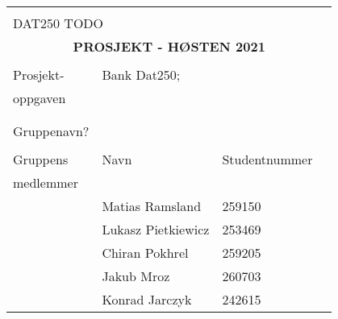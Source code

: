 \documentclass[11pt,a4]{report}
\begin{document}
\setlength{\parskip}{0.5cm}   %

\pagestyle{fancyplain}
\renewcommand{\chaptermark}[1]{\markboth{#1}{#1}}
\renewcommand{\sectionmark}[1]{\markright{\thesection\ #1}}
\lhead[\fancyplain{}{\bfseries\thepage}]{\fancyplain{}{\bfseries\rightmark}}
\rhead{}
\chead{}
\cfoot{\bfseries\thepage}
\lfoot{}
\rfoot{}


\renewcommand{\lstlistingname}{Kode}%


\begin{table}[hb]
	\centering
              \begin{tabular}{|l|lll|}\hline
                \multicolumn{4}{|l|}{\hspace*{130mm}}\\
                \multicolumn{4}{|l|}{DAT250 TODO}\\[-7mm]
                \multicolumn{4}{|c|}{\Huge \bf PROSJEKT - HØSTEN 2021
                }\\[5mm]\hline
                & & &  \\[-3mm]
                Prosjekt- & \multicolumn{3}{|l|}{Bank Dat250;} \\
                oppgaven & \multicolumn{3}{|l|}{}\\[2mm]\hline
                \multicolumn{4}{c}{}\\[5mm]\hline
                & & &  \\[-3mm]
                Gruppenavn? & \multicolumn{3}{|l|}{\color{red}{AlphaBank?}} \\[2mm]\hline
                & & &\\[-3mm]
                Gruppens  & Navn &  Studentnummer & \\
                medlemmer  &   &   &  \\[2mm]
                & Matias Ramsland & 259150     &  \\[6mm]
                & Lukasz Pietkiewicz & 253469     &  \\[6mm]
                & Chiran Pokhrel & 259205     &  \\[6mm]
                & Jakub Mroz  & 260703       & \\[6mm]
                & Konrad Jarczyk & 242615 & \\[20mm]
                 \hline
              \end{tabular}
\end{table}
\end{document}
